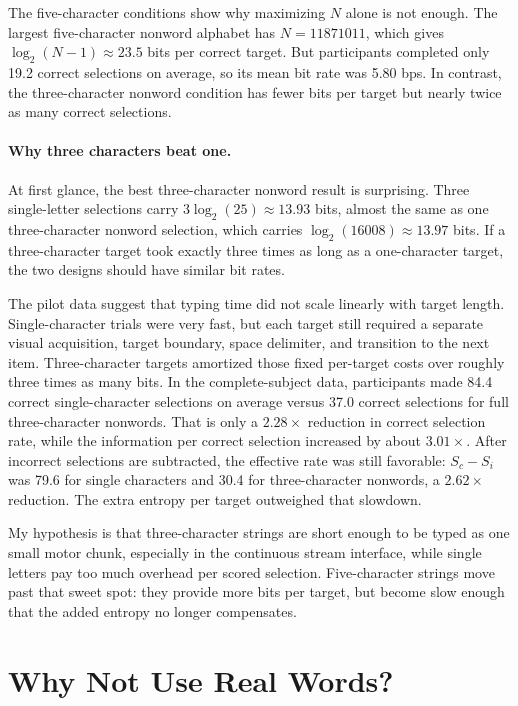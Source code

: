 \documentclass[11pt]{article}
\begin{document}
The five-character conditions show why maximizing \(N\) alone is not enough. The largest five-character nonword alphabet has \(N=11871011\), which gives \(\log_2(N-1)\approx23.5\) bits per correct target. But participants completed only 19.2 correct selections on average, so its mean bit rate was 5.80 bps. In contrast, the three-character nonword condition has fewer bits per target but nearly twice as many correct selections.

\paragraph{Why three characters beat one.}
At first glance, the best three-character nonword result is surprising. Three single-letter selections carry \(3\log_2(25)\approx13.93\) bits, almost the same as one three-character nonword selection, which carries \(\log_2(16008)\approx13.97\) bits. If a three-character target took exactly three times as long as a one-character target, the two designs should have similar bit rates.

The pilot data suggest that typing time did not scale linearly with target length. Single-character trials were very fast, but each target still required a separate visual acquisition, target boundary, space delimiter, and transition to the next item. Three-character targets amortized those fixed per-target costs over roughly three times as many bits. In the complete-subject data, participants made 84.4 correct single-character selections on average versus 37.0 correct selections for full three-character nonwords. That is only a \(2.28\times\) reduction in correct selection rate, while the information per correct selection increased by about \(3.01\times\). After incorrect selections are subtracted, the effective rate was still favorable: \(S_c-S_i\) was 79.6 for single characters and 30.4 for three-character nonwords, a \(2.62\times\) reduction. The extra entropy per target outweighed that slowdown.

My hypothesis is that three-character strings are short enough to be typed as one small motor chunk, especially in the continuous stream interface, while single letters pay too much overhead per scored selection. Five-character strings move past that sweet spot: they provide more bits per target, but become slow enough that the added entropy no longer compensates.

\section{Why Not Use Real Words?}
\end{document}
